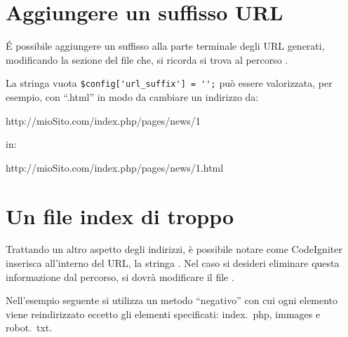 \section{Aggiungere un suffisso URL}
\'E possibile aggiungere un suffisso alla parte terminale degli \ac{URL} generati, modificando la sezione  del file  che, si ricorda si trova al percorso  . 

La stringa vuota \verb|$config['url_suffix'] = '';| può essere valorizzata, per esempio, con ``.html'' in modo da cambiare un indirizzo da: 

\begin{code}
http://mioSito.com/index.php/pages/news/1
\end{code}

in:

\begin{code}
http://mioSito.com/index.php/pages/news/1.html
\end{code}

\label{sec:index}
\section{Un file index di troppo}
Trattando un altro aspetto degli indirizzi, è possibile notare come CodeIgniter inserisca all'interno del \ac{URL}, la stringa . Nel caso si desideri eliminare questa informazione dal percorso, si dovrà modificare il file . 

Nell'esempio seguente si utilizza un metodo ``negativo'' con cui ogni elemento viene reindirizzato eccetto gli elementi specificati: index.~php, immages e robot.~txt.

